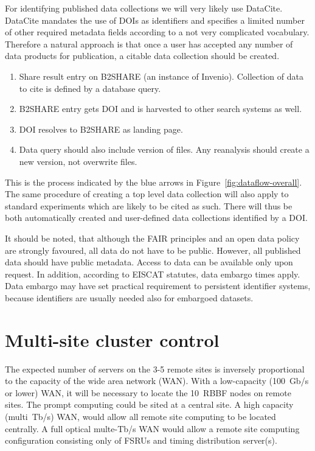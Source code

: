 \documentclass[12pt,a4paper]{article}
\begin{document}
For identifying published data collections we will very likely use DataCite. DataCite mandates the use of DOIs as identifiers and specifies a limited number of other required metadata fields according to a not very complicated vocabulary.
Therefore a natural approach is that once a user has accepted any number of data products for publication, a citable data collection should be created. 
\begin{enumerate}
    \item Share result entry on B2SHARE (an instance of Invenio). Collection of data to cite is defined by a database query.
    \item B2SHARE entry gets DOI and is harvested to other search systems as well.
    \item DOI resolves to B2SHARE as landing page.
    \item Data query should also include version of files. Any reanalysis should create a new version, not overwrite files.
\end{enumerate}
This is the process indicated by the blue arrows in Figure~\ref{fig:dataflow-overall}.
The same procedure of creating a top level data collection will also apply to standard \ED experiments which are likely to be cited as such. There will thus be both automatically created and user-defined data collections identified by a DOI.

It should be noted, that although the FAIR principles and an open data policy are strongly favoured, all data do not have to be public. However, all published data should have public metadata. Access to data can be available only upon request. In addition, according to EISCAT statutes, data embargo times apply. Data embargo may have set practical requirement to 
persistent identifier systems, because identifiers are usually needed also for embargoed datasets.

\section{Multi-site cluster control}
The expected number of servers on the 3-5 remote sites is inversely proportional to the capacity of the wide area network (WAN).
With a low-capacity (100~Gb/s or lower) WAN, it will be necessary to locate the 10~RBBF nodes on remote sites. 
The prompt computing could be sited at a central site.
A high capacity (multi~Tb/s) WAN, would allow all remote site computing to be located centrally.
A full optical multe-Tb/s WAN would allow a remote site computing configuration consisting only of FSRUs and timing distribution server(s). 
\end{document}
